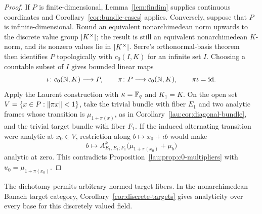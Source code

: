 \begin{proof}
If $P$ is finite-dimensional, Lemma~\ref{lem:findim} supplies continuous coordinates and Corollary~\ref{cor:bundle-cases} applies. Conversely, suppose that $P$ is infinite-dimensional. Round an equivalent nonarchimedean norm upwards to the discrete value group $\lvert K^\times\rvert$; the result is still an equivalent nonarchimedean $K$\nobreakdash-norm, and its nonzero values lie in $\lvert K^\times\rvert$. Serre's orthonormal-basis theorem~\cite[\S1, Proposition~1]{Se} then identifies $P$ topologically with $c_0(I,K)$ for an infinite set $I$. Choosing a countable subset of $I$ gives bounded linear maps
\[
 \iota\colon c_0(\mathbb N,K)\longrightarrow P,\qquad
 \pi\colon P\longrightarrow c_0(\mathbb N,K),\qquad \pi\iota=\mathrm{id}.
\]
Apply the Laurent construction with $\kappa=\mathbb F_q$ and $K_1=K$. On the open set $V=\{x\in P:\lVert \pi x\rVert<1\}$, take the trivial bundle with fiber $E_1$ and two analytic frames whose transition is $\mu_{1+\pi(x)}$, as in Corollary~\ref{lau:cor:diagonal-bundle}, and the trivial target bundle with fiber $F_1$. If the induced alternating transition were analytic at $x_0\in V$, restriction along $b\mapsto x_0+\iota b$ would make
\[
 b\longmapsto A^k_{E_1,E_1;F_1}\bigl(\mu_{1+\pi(x_0)}+\mu_b\bigr)
\]
analytic at zero. This contradicts Proposition~\ref{lau:prop:c0-multipliers} with $u_0=\mu_{1+\pi(x_0)}$.
\end{proof}

The dichotomy permits arbitrary normed target fibers. In the nonarchimedean Banach target category, Corollary~\ref{cor:discrete-targets} gives analyticity over every base for this discretely valued field.
